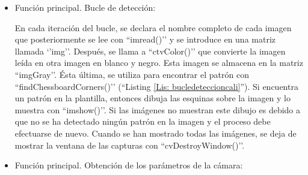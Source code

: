 \begin{itemize}
    \item Función principal. Bucle de detección:

    
En cada iteración del bucle, se declara el nombre completo de cada imagen que posteriormente se lee con ``imread()’’ y se introduce en una matriz llamada ‘’img’’. Después, se llama a ``ctvColor()’’ que convierte la imagen leída en otra imagen en blanco y negro. Esta imagen se almacena en la matriz ``imgGray’’. Ésta última, se utiliza para encontrar el patrón con ``findChessboardCorners()’’ (``Listing \ref{Lis: bucledeteccioncali}''). Si encuentra un patrón en la plantilla, entonces dibuja las esquinas sobre la imagen y lo muestra con ``imshow()’’.  Si las imágenes no muestran este dibujo es debido a que no se ha detectado ningún patrón en la imagen y el proceso debe efectuarse de nuevo. Cuando se han mostrado todas las imágenes, se deja de mostrar la ventana de las capturas con ``cvDestroyWindow()’’.

    \item Función principal. Obtención de los parámetros de la cámara: 
    

\end{itemize}
